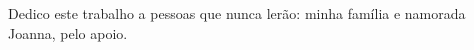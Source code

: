 \begin{dedicatoria}

Dedico este trabalho a pessoas que nunca lerão: minha família e namorada
Joanna, pelo apoio.

\end{dedicatoria}